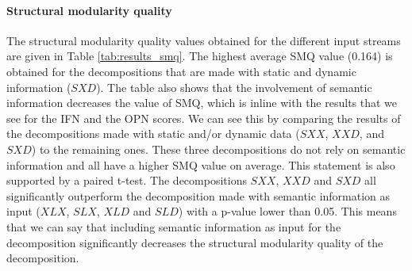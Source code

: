 \paragraph{Structural modularity quality}
The structural modularity quality values obtained for the different input streams are given in Table \ref{tab:results_smq}. The highest average SMQ value (0.164) is obtained for the decompositions that are made with static and dynamic information ($SXD$). The table also shows that the involvement of semantic information decreases the value of SMQ, which is inline with the results that we see for the IFN and the OPN scores. We can see this by comparing the results of the decompositions made with static and/or dynamic data ($SXX$, $XXD$, and $SXD$) to the remaining ones. These three decompositions do not rely on semantic information and all have a higher SMQ value on average. This statement is also supported by a paired t-test. The decompositions $SXX$, $XXD$ and $SXD$ all significantly outperform the decomposition made with semantic information as input ($XLX$, $SLX$, $XLD$ and $SLD$) with a p-value lower than 0.05. This means that we can say that including semantic information as input for the decomposition significantly decreases the structural modularity quality of the decomposition.



